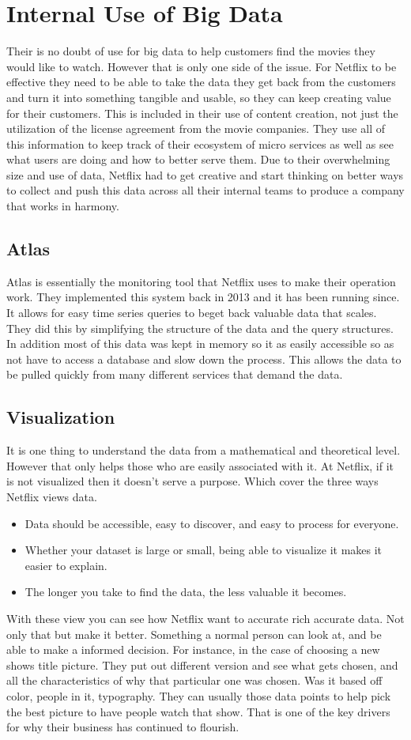\documentclass[sigconf]{acmart}
\begin{document}
\section{Internal Use of Big Data}
Their is no doubt of use for big data to help customers find the movies they would like to watch.  However that is only one side of the issue.  For Netflix to be effective they need to be able to take the data they get back from the customers and turn it into something tangible and usable, so they can keep creating value for their customers.  This is included in their use of content creation, not just the utilization of the license agreement from the movie companies.  They use all of this information to keep track of their ecosystem of micro services as well as see what users are doing and how to better serve them.  Due to their overwhelming size and use of data, Netflix had to get creative and start thinking on better ways to collect and push this data across all their internal teams to produce a company that works in harmony.  
\subsection{Atlas}
Atlas is essentially the monitoring tool that Netflix uses to make their operation work.  They implemented this system back in 2013 and it has been running since. It allows for easy time series queries to beget back valuable data that scales.  They did this by simplifying the structure of the data and the query structures.  In addition most of this data was kept in memory so it as easily accessible so as not have to access a database and slow down the process.  This allows the data to be pulled quickly from many different services that demand the data.  \cite{Netflix}
\subsection{Visualization}
It is one thing to understand the data from a mathematical and theoretical level.  However that only helps those who are easily associated with it. At Netflix, if it is not visualized then it doesn't serve a purpose. Which cover the three ways Netflix views data.
\begin{itemize}
\item Data should be accessible, easy to discover, and easy to process for everyone.
\item Whether your dataset is large or small, being able to visualize it makes it easier to explain.
\item The longer you take to find the data, the less valuable it becomes.\cite{Simon}
\end{itemize}
With these view you can see how Netflix want to accurate rich accurate data.  Not only that but make it better.  Something a normal person can look at, and be able to make a informed decision.  For instance, in the case of choosing a new shows title picture.  They put out different version and see what gets chosen, and all the characteristics of why that particular one was chosen.  Was it based off color, people in it, typography.  They can usually those data points to help pick the best picture to have people watch that show.  That is one of the key drivers for why their business has continued to flourish.  
\end{document}
